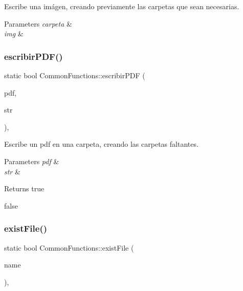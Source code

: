 Escribe una imágen, creando previamente las carpetas que sean necesarias. 


\begin{DoxyParams}{Parameters}
{\em carpeta} & \\
\hline
{\em img} & \\
\hline
\end{DoxyParams}
\mbox{\label{classCommonFunctions_a188e7c8fcb797856482ecfd4010c62a9}} 
\subsubsection{\texorpdfstring{escribir\+P\+D\+F()}{escribirPDF()}}
{\footnotesize\ttfamily static bool Common\+Functions\+::escribir\+P\+DF (\begin{DoxyParamCaption}\item[{H\+P\+D\+F\+\_\+\+Doc}]{pdf,  }\item[{string}]{str }\end{DoxyParamCaption})\hspace{0.3cm}{\ttfamily [inline]}, {\ttfamily [static]}}



Escribe un pdf en una carpeta, creando las carpetas faltantes. 


\begin{DoxyParams}{Parameters}
{\em pdf} & \\
\hline
{\em str} & \\
\hline
\end{DoxyParams}
\begin{DoxyReturn}{Returns}
true 

false 
\end{DoxyReturn}
\mbox{\label{classCommonFunctions_a91521d26a009071499a413ef4535ca8a}} 
\subsubsection{\texorpdfstring{exist\+File()}{existFile()}}
{\footnotesize\ttfamily static bool Common\+Functions\+::exist\+File (\begin{DoxyParamCaption}\item[{string}]{name }\end{DoxyParamCaption})\hspace{0.3cm}{\ttfamily [inline]}, {\ttfamily [static]}}



